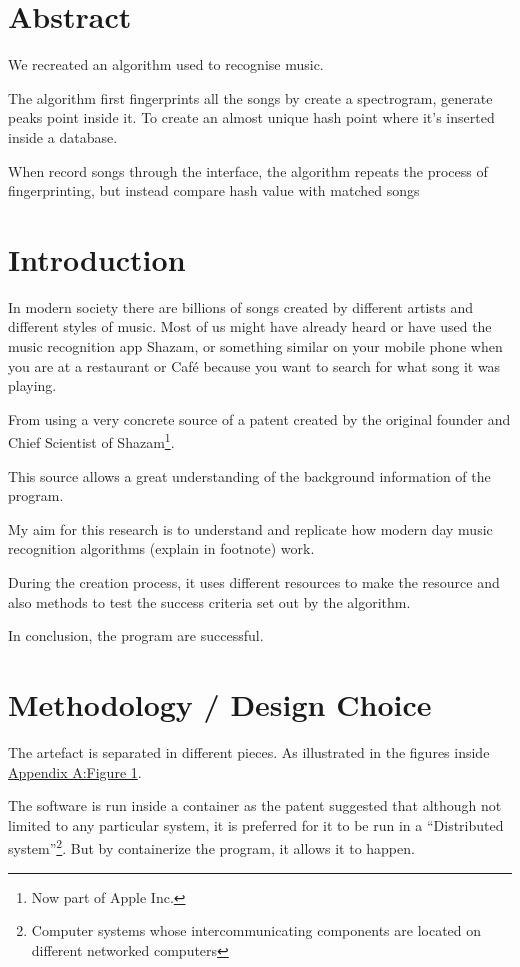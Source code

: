 \chapter*{Abstract}
We recreated an algorithm used to recognise music. 

The algorithm first fingerprints all the songs by create a spectrogram, generate peaks point inside it. To create an almost unique hash point where it's inserted inside a database. 

When record songs through the interface, the algorithm repeats the process of fingerprinting, but instead compare hash value with matched songs
\chapter{Introduction}

In modern society there are billions of songs created by different artists and different styles of music. Most of us might have already heard or have used the music recognition app Shazam\trademark, or something similar on your mobile phone when you are at a restaurant or Café because you want to search for what song it was playing. 

From using a very concrete source of a patent created by the original founder and Chief Scientist of Shazam\trademark \footnote{Now part of Apple Inc\trademark.}\cite{noauthor_avery_nodate}.

This source allows a great understanding of the background information of the program. 

My aim for this research is to understand and replicate how modern day music recognition algorithms (explain in footnote) work. 

During the creation process, it uses different resources to make the resource and also methods to test the success criteria set out by the algorithm. 

In conclusion, the program are successful.
\chapter{Methodology / Design Choice}
The artefact is separated in different pieces. As illustrated in the figures inside \hyperref[fig:overall_arch]{Appendix A:Figure 1}. 

The software is run inside a container as the patent suggested that although not limited to any particular system, it is preferred for it to be run in a “Distributed system”\footnote{Computer systems whose intercommunicating components are located on different networked computers\cite{noauthor_distributed_2024}}. But by containerize the program, it allows it to happen.

